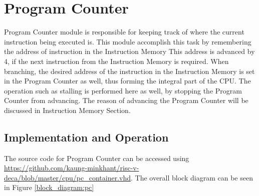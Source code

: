 \section{Program Counter}
Program Counter module is responsible for keeping track of where the current instruction being executed is.
This module accomplish this task by remembering the address of instruction in the Instruction Memory
This address is advanced by 4, if the next instruction from the Instruction Memory is required.
When branching, the desired address of the instruction in the Instruction Memory is set in the
Program Counter as well, thus forming the integral part of the CPU. The operation such as
stalling is performed here as well, by stopping the Program Counter from advancing. The reason of advancing the
Program Counter will be discussed in Instruction Memory Section.

\subsection{Implementation and Operation}
The source code for Program Counter
can be accessed using \url{https://github.com/kaung-minkhant/risc-v-deca/blob/master/cpu/pc_container.vhd}.
The overall block diagram can be seen in Figure \ref{block_diagram:pc}

